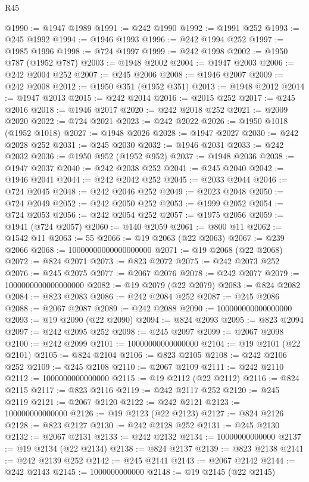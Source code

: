 \begin{lexlean}{R45}
\begin{coremodule}
{@1990 := @1947 @1989
@1991 := @242 @1990
@1992 := @1991 @252
@1993 := @245 @1992
@1994 := @1946 @1993
@1996 := @242 @1994 @252
@1997 := @1985 @1996
@1998 := @724 @1997
@1999 := @242 @1998
@2002 := @1950 @787 (@1952 @787)
@2003 := @1948 @2002
@2004 := @1947 @2003
@2006 := @242 @2004 @252
@2007 := @245 @2006
@2008 := @1946 @2007
@2009 := @242 @2008
@2012 := @1950 @351 (@1952 @351)
@2013 := @1948 @2012
@2014 := @1947 @2013
@2015 := @242 @2014
@2016 := @2015 @252
@2017 := @245 @2016
@2018 := @1946 @2017
@2020 := @242 @2018 @252
@2021 := @2009 @2020
@2022 := @724 @2021
@2023 := @242 @2022
@2026 := @1950 @1018 (@1952 @1018)
@2027 := @1948 @2026
@2028 := @1947 @2027
@2030 := @242 @2028 @252
@2031 := @245 @2030
@2032 := @1946 @2031
@2033 := @242 @2032
@2036 := @1950 @952 (@1952 @952)
@2037 := @1948 @2036
@2038 := @1947 @2037
@2040 := @242 @2038 @252
@2041 := @245 @2040
@2042 := @1946 @2041
@2044 := @242 @2042 @252
@2045 := @2033 @2044
@2046 := @724 @2045
@2048 := @242 @2046 @252
@2049 := @2023 @2048
@2050 := @724 @2049
@2052 := @242 @2050 @252
@2053 := @1999 @2052
@2054 := @724 @2053
@2056 := @242 @2054 @252
@2057 := @1975 @2056
@2059 := @1941 (@724 @2057)
@2060 := @140 @2059
@2061 := @800 @11
@2062 := @1542 @11
@2063 := 55
@2066 := @19 @2063 (@22 @2063)
@2067 := @239 @2066
@2068 := 10000000000000000000
@2071 := @19 @2068 (@22 @2068)
@2072 := @824 @2071
@2073 := @823 @2072
@2075 := @242 @2073 @252
@2076 := @245 @2075
@2077 := @2067 @2076
@2078 := @242 @2077
@2079 := 1000000000000000000
@2082 := @19 @2079 (@22 @2079)
@2083 := @824 @2082
@2084 := @823 @2083
@2086 := @242 @2084 @252
@2087 := @245 @2086
@2088 := @2067 @2087
@2089 := @242 @2088
@2090 := 100000000000000000
@2093 := @19 @2090 (@22 @2090)
@2094 := @824 @2093
@2095 := @823 @2094
@2097 := @242 @2095 @252
@2098 := @245 @2097
@2099 := @2067 @2098
@2100 := @242 @2099
@2101 := 10000000000000000
@2104 := @19 @2101 (@22 @2101)
@2105 := @824 @2104
@2106 := @823 @2105
@2108 := @242 @2106 @252
@2109 := @245 @2108
@2110 := @2067 @2109
@2111 := @242 @2110
@2112 := 1000000000000000
@2115 := @19 @2112 (@22 @2112)
@2116 := @824 @2115
@2117 := @823 @2116
@2119 := @242 @2117 @252
@2120 := @245 @2119
@2121 := @2067 @2120
@2122 := @242 @2121
@2123 := 100000000000000
@2126 := @19 @2123 (@22 @2123)
@2127 := @824 @2126
@2128 := @823 @2127
@2130 := @242 @2128 @252
@2131 := @245 @2130
@2132 := @2067 @2131
@2133 := @242 @2132
@2134 := 10000000000000
@2137 := @19 @2134 (@22 @2134)
@2138 := @824 @2137
@2139 := @823 @2138
@2141 := @242 @2139 @252
@2142 := @245 @2141
@2143 := @2067 @2142
@2144 := @242 @2143
@2145 := 1000000000000
@2148 := @19 @2145 (@22 @2145)
}
\end{coremodule}
\end{lexlean}
